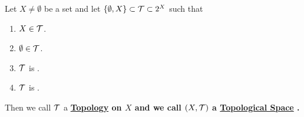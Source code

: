 
\newcommand{\scTopologicalSpace}[2]{
    \pa{#1, \scTopology{#1}{#2}}
}
\newcommand{\scTopology}[2]{
    #2_{#1}
}
\newcommand{\TopologicalSpace}[0]{
    \bf \hyperref[def:TopologicalSpace]{Topological Space} \rm
}
\newcommand{\Topology}[0]{
        \bf \hyperref[def:TopologicalSpace]{Topology} \rm
}
\newcommand{\TopologicalSpaces}[0]{
    \bf \hyperref[def:TopologicalSpace]{Topological Spaces} \rm
}
\newcommand{\Topologies}[0]{
        \bf \hyperref[def:TopologicalSpace]{Topologies} \rm
}

\begin{df}
    \label{def:TopologicalSpace}
    Let $X \neq \emptyset$ be a set 
    and let $\{\emptyset, X\} \subset \mathcal{T} \subset 2^X$ such that
    \begin{enumerate}[label=(\roman*), ref={\ref{def:TopologicalSpace}~/roman*}]
    \item \label{def:TopologicalSpace:ContainsX} $X \in \mathcal{T}$. 
    \item \label{def:TopologicalSpace:ContainsEmptyset} $\emptyset \in \mathcal{T}$. 
    \item \label{def:TopologicalSpace:ClosureUnderUnions} $\mathcal{T}$ is 
    \ClosedUnderArbitraryUnions.
    \item \label{def:TopologicalSpace:ClosureUnderFiniteIntersections} $\mathcal{T}$
    is \ClosedUnderFiniteIntersections. 
    \end{enumerate}
    Then we call $\mathcal{T}$ a \Topology on $X$ and we call 
    $(X,\mathcal{T})$ a \TopologicalSpace. 
\end{df}



